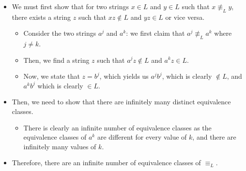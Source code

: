 \documentclass{article}
\begin{document}
\\
\\
\\
\noindent 
\begin{itemize}
    \item We must first show that for two strings \(x \in L\) and \(y \in L\) such that \(x \not \equiv_L y\), there exists a string \(z\) such that \(xz \notin L\) and \(yz\in L\) or vice versa.
    \begin{itemize}
        \item Consider the two strings \(a^j\) and \(a^k\): we first claim that \(a^j \not\equiv_L a^k\) where \(j\neq k\).
        \item Then, we find a string \(z\) such that \(a^j z \notin L\) and \(a^k z\in L\).
        \item Now, we state that \(z = b^j\), which yields us \(a^j b^j\), which is clearly \(\notin L\), and \(a^k b^j\) which is clearly \( \in L\).
    \end{itemize}
    \item  Then, we need to show that there are infinitely many distinct equivalence classes.
    \begin{itemize}
        \item There is clearly an infinite number of equivalence classes as the equivalence classes of \(a^k\) are different for every value of \(k\), and there are infinitely many values of \(k\).
    \end{itemize}
    \item Therefore, there are an infinite number of equivalence classes of \(\equiv_L\).
\end{itemize}
\\\noindent 
\end{document}
